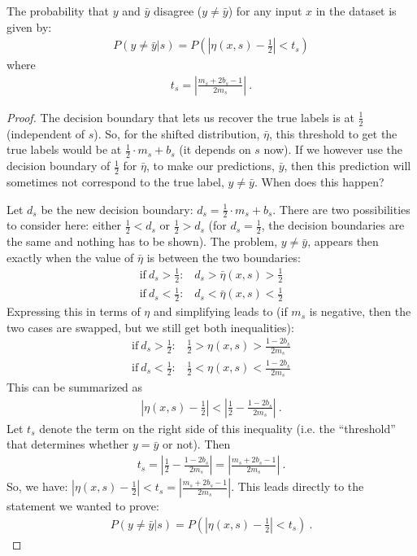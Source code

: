 \begin{theorem}\label{th:tsybakov}
  The probability that $y$ and $\bar{y}$ disagree ($y\neq\bar{y}$) for any input $x$ in the dataset is given by:
  \begin{align}
    P(y\neq\bar{y}|s)=P\left(\left|\eta(x,s) - \tfrac{1}{2}\right| < t_s\right)
  \end{align}
  where
  \begin{align}
    t_s = \left|\frac{m_s+2b_s-1}{2m_s}\right|~.\label{eq:def-ts2}
  \end{align}
\end{theorem}
\begin{proof}
  The decision boundary that lets us recover the true labels is at $\tfrac{1}{2}$ (independent of $s$).
  So, for the shifted distribution, $\bar{\eta}$, this threshold to get the true labels would be at $\tfrac{1}{2}\cdot m_s + b_s$ (it depends on $s$ now).
  If we however use the decision boundary of $\tfrac{1}{2}$ for $\bar{\eta}$, to make our predictions, $\bar{y}$, then this prediction will sometimes not correspond to the true label, $y\neq\bar{y}$. When does this happen?

  Let $d_s$ be the new decision boundary: $d_s=\tfrac{1}{2}\cdot m_s + b_s$. There are two possibilities to consider here:
  either $\tfrac{1}{2}<d_s$ or $\tfrac{1}{2}>d_s$ (for $d_s=\tfrac{1}{2}$, the decision boundaries are the same and nothing has to be shown).
  The problem, $y\neq\bar{y}$, appears then exactly when the value of $\bar{\eta}$ is between the two boundaries:
  \begin{align}
    \text{if}~d_s>\tfrac{1}{2}\text{:}\quad d_s>\bar{\eta}(x, s)>\tfrac{1}{2} \\
    \text{if}~d_s<\tfrac{1}{2}\text{:}\quad d_s<\bar{\eta}(x, s)<\tfrac{1}{2}
  \end{align}
  Expressing this in terms of $\eta$ and simplifying leads to
  (if $m_s$ is negative, then the two cases are swapped, but we still get both inequalities):
  \begin{align}
    \text{if}~d_s>\tfrac{1}{2}\text{:}\quad\frac{1}{2}>\eta(x,s)>\frac{1-2b_s}{2m_s} \\
    \text{if}~d_s<\tfrac{1}{2}\text{:}\quad\frac{1}{2}<\eta(x,s)<\frac{1-2b_s}{2m_s}
  \end{align}
  This can be summarized as
  \begin{align}
    \left|\eta(x,s)-\frac{1}{2}\right|<\left|\frac{1}{2}-\frac{1-2b_s}{2m_s}\right|~.
  \end{align}
  Let $t_s$ denote the term on the right side of this inequality (i.e. the ``threshold'' that determines whether $y=\bar{y}$ or not). Then
  \begin{align}
    t_s=\left|\frac{1}{2} -\frac{1-2b_s}{2m_s}\right|=\left|\frac{m_s+2b_s-1}{2m_s}\right|~.
  \end{align}
  So, we have: $\left|\eta(x, s) - \frac{1}{2}\right| < t_s =\left|\tfrac{m_s+2b_s-1}{2m_s}\right|$.
  This leads directly to the statement we wanted to prove:
  \begin{align}
    P(y\neq\bar{y}|s)=P\left(\left|\eta(x, s)-\frac{1}{2}\right| <t_s\right)~.
  \end{align}
\end{proof}

